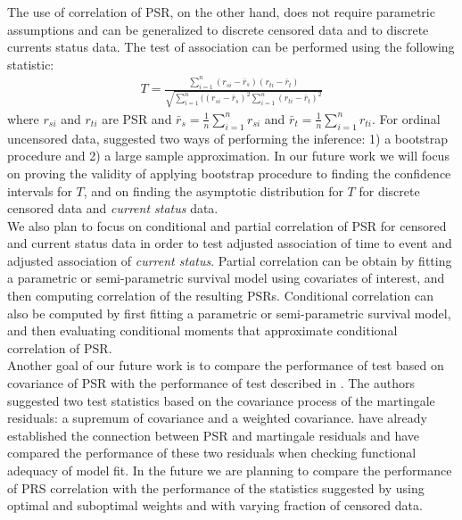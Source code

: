 \documentclass[]{article}
\begin{document}
The use of correlation of PSR, on the other hand, does not require parametric assumptions and can be generalized to discrete censored data and to discrete currents status data. The test of association can be performed using the following statistic:
$$
\begin{aligned}
	T = \frac{\sum_{i=1}^{n} (r_{si} - \bar{r}_s)(r_{ti} - \bar{r}_t)}{\sqrt{\sum_{i=1}^{n} ((r_{si} - \bar{r}_s)^2\sum_{i=1}^{n} (r_{ti} - \bar{r}_t)^2}}
\end{aligned}
$$
where $r_{si}$ and $r_{ti}$ are PSR and $\bar{r}_s = \frac{1}{n}\sum_{i=1}^{n} r_{si}$ and $\bar{r}_t = \frac{1}{n}\sum_{i=1}^{n} r_{ti}$. For ordinal uncensored data, \cite{li2010test} suggested two ways of performing the inference: 1) a bootstrap procedure and 2) a large sample approximation. In our future work we will focus on proving the validity of applying bootstrap procedure to finding the confidence intervals for $T$, and on finding the asymptotic distribution for $T$ for discrete censored data and \emph{current status} data.\\

We also plan to focus on conditional and partial correlation of PSR for censored and current status data in order to test adjusted association of time to event and adjusted association of \emph{current status}. Partial correlation can be obtain by fitting a parametric or semi-parametric survival model using covariates of interest, and then computing correlation of the resulting PSRs. Conditional correlation can also be computed by first fitting a parametric or semi-parametric survival model, and then evaluating conditional moments that approximate conditional correlation of PSR.\\

Another goal of our future work is to compare the performance of test based on covariance of PSR with the performance of test described in \cite{shih1996tests}. The authors suggested two test statistics based on the covariance process of the martingale residuals: a supremum of covariance and a weighted covariance. \cite{shepherd2016probability} have already established the connection between PSR and martingale residuals and have compared the performance of these two residuals when checking functional adequacy of model fit. In the future we are planning to compare the performance of PRS correlation with the performance of the statistics suggested by \cite{shih1996tests} using optimal and suboptimal weights and with varying fraction of censored data.
\end{document}
